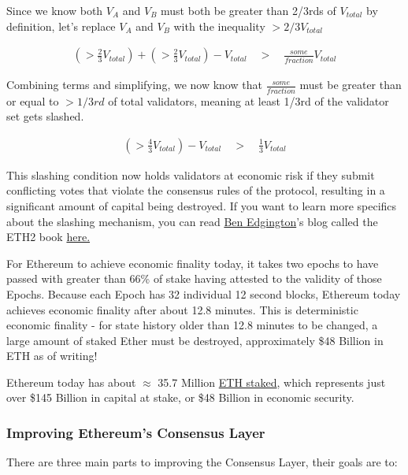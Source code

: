 \documentclass[12pt]{article}
\newenvironment{aside}
  {\begin{mdframed}[style=0,%
      backgroundcolor=fgcolor!5!\thepagecolor,  %
      fontcolor=fgcolor,     %
      leftline=false,rightline=false,leftmargin=2em,rightmargin=2em,%
      innerleftmargin=0pt,innerrightmargin=0pt,linewidth=0.75pt,%
      skipabove=7pt,skipbelow=7pt]\footnotesize}
  {\end{mdframed}}
\begin{document}
\begin{aside}
Since we know both $V_A$ and $V_B$ must both be greater than 2/3rds of $V_{total}$ by definition, let's replace $V_A$ and $V_B$ with the inequality $>2/3V_{total}$

\begin{align}
    (>\frac{2}{3}V_{total})+(>\frac{2}{3}V_{total}) - V_{total} \quad > \quad \frac{some}{fraction}V_{total} 
\end{align}

Combining terms and simplifying, we now know that $\frac{some}{fraction}$ must be greater than or equal to $>1/3rd$ of total validators, meaning at least 1/3rd of the validator set gets slashed. 

\begin{align}
    (>\frac{4}{3}V_{total}) - V_{total} \quad > \quad \frac{1}{3}V_{total} 
\end{align} 

This slashing condition now holds validators at economic risk if they submit conflicting votes that violate the consensus rules of the protocol, resulting in a significant amount of capital being destroyed. If you want to learn more specifics about the slashing mechanism, you can read 
\href{https://x.com/benjaminion_xyz}{Ben Edgington}'s blog called the ETH2 book 
\href{https://eth2book.info/capella/part2/incentives/slashing/}{here.} 
    
\end{aside}

For Ethereum to achieve economic finality today, it takes two epochs to have passed with greater than 66\% of stake having attested to the validity of those Epochs. Because each Epoch has 32 individual 12 second blocks, Ethereum today achieves economic finality after about 12.8 minutes. This is deterministic economic finality - for state history older than 12.8 minutes to be changed, a large amount of staked Ether must be destroyed, approximately \$48 Billion in ETH as of writing!

Ethereum today has about $\approx$ 35.7 Million \href{https://beaconcha.in/}{ETH staked}, which represents just over \$145 Billion in capital at stake, or \$48 Billion in economic security. 
\clearpage
\subsubsection{Improving Ethereum's Consensus Layer}

There are three main parts to improving the Consensus Layer, their goals are to: 
\end{document}
